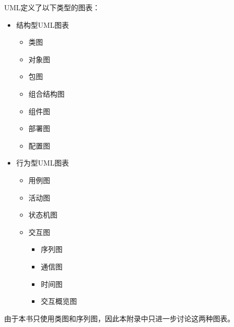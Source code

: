 UML定义了以下类型的图表：

\begin{itemize}
\item
结构型UML图表

\begin{itemize}
\item
类图

\item
对象图

\item
包图

\item
组合结构图

\item
组件图

\item
部署图

\item
配置图
\end{itemize}

\item
行为型UML图表

\begin{itemize}
\item
用例图

\item
活动图

\item
状态机图

\item
交互图
\begin{itemize}
\item
序列图

\item
通信图

\item
时间图

\item
交互概览图
\end{itemize}
\end{itemize}

\end{itemize}

由于本书只使用类图和序列图，因此本附录中只进一步讨论这两种图表。













